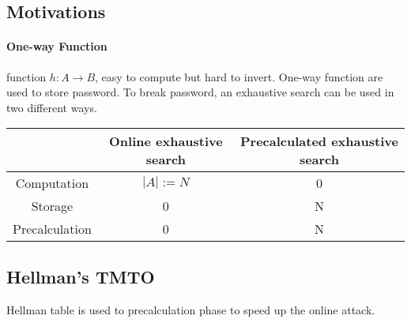 \subsection{Motivations}

\paragraph{One-way Function} function $h:A \rightarrow B$, easy to compute but
hard to invert.
One-way function are used to store password. To break password, an exhaustive
search can be used in two different ways.
\begin{table}[ht!]
    \centering
    \begin{tabular}{c|c|c}
        & Online exhaustive search & Precalculated exhaustive search \\
        \hline
        Computation & $ |A|:=N $ & 0 \\
        Storage & 0 & N \\
        Precalculation & 0 & N \\
    \end{tabular}
\end{table}

\subsection{Hellman's TMTO}
Hellman table is used to precalculation phase to speed up the online attack.
